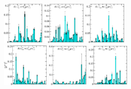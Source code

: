 \begin{figure}[H]
    \hspace*{-0.1cm}\includegraphics[width=0.185\textwidth]{figures/sigmas/hg/zfactors/zfactor_isotriplet_kbar_delta-Hg_1-P001-A2-SS_1-P00-1-G2-SS_0.pdf}
    \includegraphics[width=0.185\textwidth]{figures/sigmas/hg/zfactors/zfactor_isotriplet_kbar_delta-Hg_1-P010-A2-SS_1-P0-10-G1-SS_0.pdf}
    \hspace*{-0.075cm}\includegraphics[width=0.185\textwidth]{figures/sigmas/hg/zfactors/zfactor_isotriplet_kbar_nucleon-Hg_1-CG_1-P001-E-SS_2-P00-1-G1-SS_0.pdf}\\
    \hspace*{-0.1cm}\includegraphics[width=0.205\textwidth]{figures/sigmas/hg/zfactors/zfactor_isotriplet_kbar_nucleon-Hg_1-CG_1-P011-A2-SS_0-P0-1-1-G-SS_0.pdf}
    \hspace*{0.1cm}\includegraphics[width=0.18\textwidth]{figures/sigmas/hg/zfactors/zfactor_isotriplet_kbar_nucleon-Hg_1-CG_1-P011-A2-SS_1-P0-1-1-G-SS_0.pdf}
    \hspace*{-0.1cm}\includegraphics[width=0.185\textwidth]{figures/sigmas/hg/zfactors/zfactor_isotriplet_kbar_nucleon-Hg_1-P001-E-SS_2-P00-1-G1-SS_0.pdf}

\end{figure}
